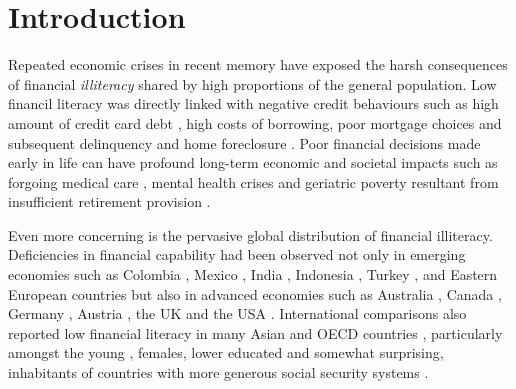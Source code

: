 \documentclass[a4paper,11pt,UKenglish,twoside,openright]{report}\usepackage[]{graphicx}\usepackage[]{color}
\begin{document}
\clearpage
\thispagestyle{empty}

\setcounter{page}{0} %


\chapter{Introduction}
\label{chp:1}



Repeated economic crises in recent memory have exposed the harsh consequences of financial \emph{illiteracy} shared by high proportions of the general population. Low financil literacy was directly linked with negative credit behaviours such as high amount of credit card debt \parencite{meier:2010}, high costs of borrowing, poor mortgage choices and subsequent delinquency and home foreclosure \parencite{hastings:2013}. Poor financial decisions made early in life can have profound long-term economic and societal impacts \parencite{montoya:2013} such as forgoing medical care \parencite{lusardi:2015}, mental health crises \parencite{stone:2018} and geriatric poverty resultant from insufficient retirement provision \parencite{lusardi:2007, lusardi:2008}.

Even more concerning is the pervasive global distribution of financial illiteracy. Deficiencies in financial capability had been observed not only in emerging economies \parencite{karakurumozdemir:2019} such as Colombia \parencite{caoalvira:2020}, Mexico \parencite{arceogomez:2017, bohm:2021}, India \parencite{agarwal:2015, kiliyanni:2016, utkarsh:2020}, Indonesia \parencite{cole:2009, khoirunnisaa:2020}, Turkey \parencite{akbenselcuk:2014}, and Eastern European countries \parencite{belas:2016, opletalova:2015, reiter:2020} but also in advanced economies such as Australia \parencite{ali:2014, taylor:2013, thomson:2017}, Canada \parencite{boisclair:2017}, Germany \parencite{bucherkoenen:2017, erner:2016}, Austria \parencite{silgoner:2015}, the UK \parencite{barnard:2021} and the USA \parencite{breitbach:2016, gale:2012, huston:2012, lusardi:2010}. International comparisons also reported low financial literacy in many Asian \parencite{yoshino:2015} and OECD countries \parencite{cupak:2018a, lusardi:2015a}, particularly amongst the young \parencite{debeckker:2019}, females, lower educated \parencite{klapper:2019} and somewhat surprising, inhabitants of countries with more generous social security systems \parencite{jappelli:2010}.
\end{document}
